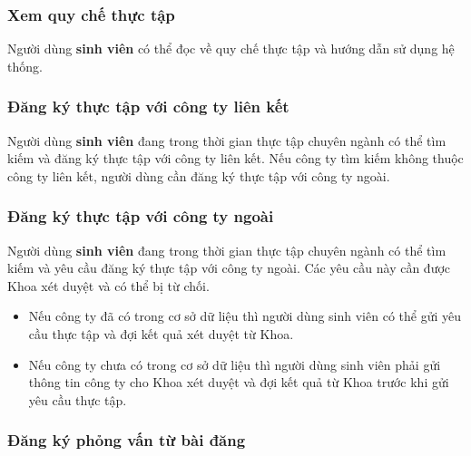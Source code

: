 \documentclass[./../main.tex]{subfiles}
\begin{document}
\subsubsection{Xem quy chế thực tập}

Người dùng \textbf{sinh viên} có thể đọc về quy chế thực tập và hướng
dẫn sử dụng hệ thống.
  
\hypertarget{ux111ux103ng-kuxfd-thux1ef1c-tux1eadp-vux1edbi-cuxf4ng-ty-liuxean-kux1ebft}{%
	\subsubsection{Đăng ký thực tập với công ty liên
		kết}\label{ux111ux103ng-kuxfd-thux1ef1c-tux1eadp-vux1edbi-cuxf4ng-ty-liuxean-kux1ebft}}
  
Người dùng \textbf{sinh viên} đang trong thời gian thực tập chuyên ngành
có thể tìm kiếm và đăng ký thực tập với công ty liên kết. Nếu công ty
tìm kiếm không thuộc công ty liên kết, người dùng cần đăng ký thực tập
với công ty ngoài.
  
\hypertarget{ux111ux103ng-kuxfd-thux1ef1c-tux1eadp-vux1edbi-cuxf4ng-ty-ngouxe0i}{%
	\subsubsection{Đăng ký thực tập với công ty
		ngoài}\label{ux111ux103ng-kuxfd-thux1ef1c-tux1eadp-vux1edbi-cuxf4ng-ty-ngouxe0i}}
  
Người dùng \textbf{sinh viên} đang trong thời gian thực tập chuyên ngành
có thể tìm kiếm và yêu cầu đăng ký thực tập với công ty ngoài. Các yêu
cầu này cần được Khoa xét duyệt và có thể bị từ chối.
  
\begin{itemize}
	\item
	      
	      	Nếu công ty đã có trong cơ sở dữ liệu thì người dùng sinh viên có thể
	      	gửi yêu cầu thực tập và đợi kết quả xét duyệt từ Khoa.
	      
	\item
	      
	      	Nếu công ty chưa có trong cơ sở dữ liệu thì người dùng sinh viên phải
	      	gửi thông tin công ty cho Khoa xét duyệt và đợi kết quả từ Khoa trước
	      	khi gửi yêu cầu thực tập.
	      
\end{itemize}
  
\hypertarget{ux111ux103ng-kuxfd-phux1ecfng-vux1ea5n-tux1eeb-buxe0i-ux111ux103ng}{%
	\subsubsection{Đăng ký phỏng vấn từ bài
		đăng}\label{ux111ux103ng-kuxfd-phux1ecfng-vux1ea5n-tux1eeb-buxe0i-ux111ux103ng}}
  
\end{document}
